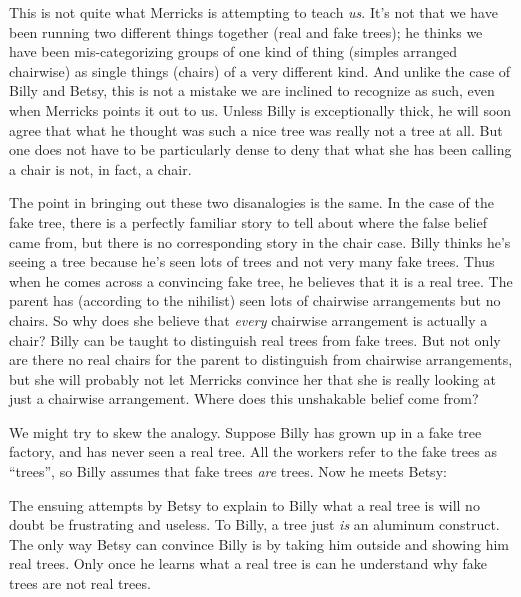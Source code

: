 \documentclass[11pt]{article}
\begin{document}
\begin{spacing}{1.25}
This is not quite what Merricks is attempting to teach {\em us}.  It's
not that we have been running two different things together (real and
fake trees); he thinks we have been mis-categorizing groups of one
kind of thing (simples arranged chairwise) as single things (chairs)
of a very different kind.  And unlike the case of Billy and Betsy,
this is not a mistake we are inclined to recognize as such, even when
Merricks points it out to us.  Unless Billy is exceptionally thick, he
will soon agree that what he thought was such a nice tree was really
not a tree at all.  But one does not have to be particularly dense to
deny that what she has been calling a chair is not, in fact, a chair.

The point in bringing out these two disanalogies is the same.  In the
case of the fake tree, there is a perfectly familiar story to tell
about where the false belief came from, but there is no corresponding
story in the chair case.  Billy thinks he's seeing a tree because he's
seen lots of trees and not very many fake trees.  Thus when he comes
across a convincing fake tree, he believes that it is a real tree.
The parent has (according to the nihilist) seen lots of chairwise
arrangements but no chairs.  So why does she believe that {\em every}
chairwise arrangement is actually a chair?  Billy can be taught to
distinguish real trees from fake trees.  But not only are there no
real chairs for the parent to distinguish from chairwise arrangements,
but she will probably not let Merricks convince her that she is really
looking at just a chairwise arrangement.  Where does this unshakable
belief come from?

We might try to skew the analogy.  Suppose Billy has grown up in a
fake tree factory, and has never seen a real tree.  All the workers
refer to the fake trees as ``trees'', so Billy assumes that fake trees
{\em are} trees.  Now he meets Betsy:






The ensuing attempts by Betsy to explain to Billy what a real tree is
will no doubt be frustrating and useless.  To Billy, a tree just {\em
  is} an aluminum construct.  The only way Betsy can convince Billy is
by taking him outside and showing him real trees.  Only once he learns
what a real tree is can he understand why fake trees are not real
trees.


\end{spacing}
\end{document}

